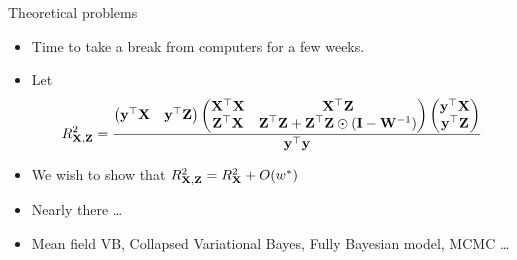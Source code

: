 \documentclass{beamer}
\begin{document}
\begin{frame}{Theoretical problems}
\begin{itemize}
\item Time to take a break from computers for a few weeks.
\item Let 
\[
R^2_{{\bf X}, {\bf Z}} = \frac{
\begin{pmatrix}
{\bf y}^\top {\bf X} & {\bf y}^\top {\bf Z}
\end{pmatrix}
\begin{pmatrix}
{\bf X}^\top {\bf X} & {\bf X}^\top {\bf Z} \\
{\bf Z}^\top {\bf X} & {\bf Z}^\top {\bf Z} + {\bf Z}^\top {\bf Z} \odot ({\bf I} - {\bf W}^{-1})
\end{pmatrix}
\begin{pmatrix}
{\bf y}^\top {\bf X}\\
{\bf y}^\top {\bf Z}
\end{pmatrix}
}{{\bf y}^\top {\bf y}}
\]
\item We wish to show that $R^2_{{\bf X}, {\bf Z}} = R^2_{\bf X} + O(w^*)$
\item Nearly there \ldots
\item Mean field VB, Collapsed Variational Bayes, Fully Bayesian model, MCMC \ldots
\end{itemize}
\end{frame}
\end{document}
